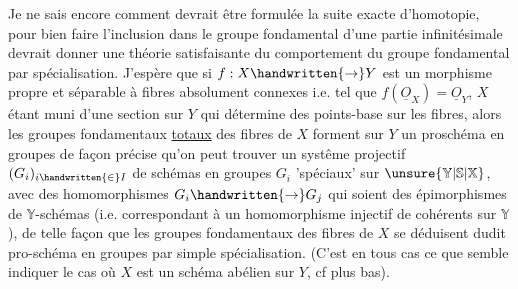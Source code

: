 Je ne sais encore comment devrait être formulée la suite exacte d'homotopie, pour bien faire l'inclusion dans le groupe fondamental d'une partie infinitésimale devrait donner une théorie satisfaisante du comportement du groupe fondamental par spécialisation. J'espère que si $f:X\handwritten{\to}Y$ est un morphisme propre et séparable à fibres absolument connexes i.e. tel que $f(\underline{O}_X)=\underline{O}_Y$, $X$ étant muni   d'une section  sur $Y$ qui détermine des points-base sur les fibres, alors les groupes fondamentaux \uline{totaux} des fibres de $X$ forment sur $Y$ un proschéma en groupes  de façon précise qu'on peut trouver un systême projectif  $(G_i)_{i\handwritten{\in}I}$ de schémas en groupes $G_i$ 'spéciaux' sur $\unsure{\mathbb{Y}|\mathbb{S}|\mathbb{X}}$, avec des homomorphismes $G_i\handwritten{\to}G_j$ qui soient des épimorphismes de $\mathbb{Y}$-schémas (i.e. correspondant à un homomorphisme injectif de  cohérents sur $\mathbb{Y}$), de telle façon que les groupes fondamentaux  des fibres de $X$ se déduisent dudit pro-schéma en groupes par simple spécialisation. (C'est en tous cas ce que semble indiquer le cas où $X$ est un schéma abélien sur $Y$, cf plus bas).
